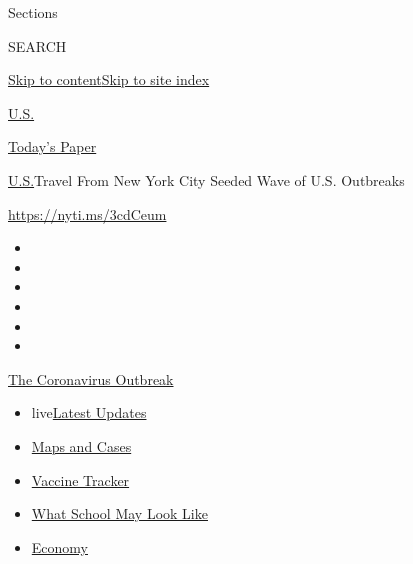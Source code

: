 Sections

SEARCH

\protect\hyperlink{site-content}{Skip to
content}\protect\hyperlink{site-index}{Skip to site index}

\href{https://www.nytimes.com/section/us}{U.S.}

\href{https://myaccount.nytimes.com/auth/login?response_type=cookie\&client_id=vi}{}

\href{https://www.nytimes.com/section/todayspaper}{Today's Paper}

\href{/section/us}{U.S.}\textbar{}Travel From New York City Seeded Wave
of U.S. Outbreaks

\url{https://nyti.ms/3cdCeum}

\begin{itemize}
\item
\item
\item
\item
\item
\item
\end{itemize}

\href{https://www.nytimes.com/news-event/coronavirus?action=click\&pgtype=Article\&state=default\&region=TOP_BANNER\&context=storylines_menu}{The
Coronavirus Outbreak}

\begin{itemize}
\tightlist
\item
  live\href{https://www.nytimes.com/2020/08/01/world/coronavirus-covid-19.html?action=click\&pgtype=Article\&state=default\&region=TOP_BANNER\&context=storylines_menu}{Latest
  Updates}
\item
  \href{https://www.nytimes.com/interactive/2020/us/coronavirus-us-cases.html?action=click\&pgtype=Article\&state=default\&region=TOP_BANNER\&context=storylines_menu}{Maps
  and Cases}
\item
  \href{https://www.nytimes.com/interactive/2020/science/coronavirus-vaccine-tracker.html?action=click\&pgtype=Article\&state=default\&region=TOP_BANNER\&context=storylines_menu}{Vaccine
  Tracker}
\item
  \href{https://www.nytimes.com/interactive/2020/07/29/us/schools-reopening-coronavirus.html?action=click\&pgtype=Article\&state=default\&region=TOP_BANNER\&context=storylines_menu}{What
  School May Look Like}
\item
  \href{https://www.nytimes.com/live/2020/07/31/business/stock-market-today-coronavirus?action=click\&pgtype=Article\&state=default\&region=TOP_BANNER\&context=storylines_menu}{Economy}
\end{itemize}

